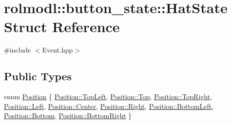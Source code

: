 \hypertarget{structrolmodl_1_1button__state_1_1_hat_state}{}\section{rolmodl\+::button\+\_\+state\+::Hat\+State Struct Reference}
\label{structrolmodl_1_1button__state_1_1_hat_state}


{\ttfamily \#include $<$Event.\+hpp$>$}

\subsection*{Public Types}
\begin{DoxyCompactItemize}
\item 
enum \mbox{\hyperlink{structrolmodl_1_1button__state_1_1_hat_state_ae56167e0c2bf1733215310a36461821e}{Position}} \{ \newline
\mbox{\hyperlink{structrolmodl_1_1button__state_1_1_hat_state_ae56167e0c2bf1733215310a36461821eab32beb056fbfe36afbabc6c88c81ab36}{Position\+::\+Top\+Left}}, 
\mbox{\hyperlink{structrolmodl_1_1button__state_1_1_hat_state_ae56167e0c2bf1733215310a36461821eaa4ffdcf0dc1f31b9acaf295d75b51d00}{Position\+::\+Top}}, 
\mbox{\hyperlink{structrolmodl_1_1button__state_1_1_hat_state_ae56167e0c2bf1733215310a36461821ea1d85a557894c340c318493f33bfa8efb}{Position\+::\+Top\+Right}}, 
\mbox{\hyperlink{structrolmodl_1_1button__state_1_1_hat_state_ae56167e0c2bf1733215310a36461821ea945d5e233cf7d6240f6b783b36a374ff}{Position\+::\+Left}}, 
\newline
\mbox{\hyperlink{structrolmodl_1_1button__state_1_1_hat_state_ae56167e0c2bf1733215310a36461821ea4f1f6016fc9f3f2353c0cc7c67b292bd}{Position\+::\+Center}}, 
\mbox{\hyperlink{structrolmodl_1_1button__state_1_1_hat_state_ae56167e0c2bf1733215310a36461821ea92b09c7c48c520c3c55e497875da437c}{Position\+::\+Right}}, 
\mbox{\hyperlink{structrolmodl_1_1button__state_1_1_hat_state_ae56167e0c2bf1733215310a36461821ea98e5a1c44509157ebcaf46c515c78875}{Position\+::\+Bottom\+Left}}, 
\mbox{\hyperlink{structrolmodl_1_1button__state_1_1_hat_state_ae56167e0c2bf1733215310a36461821ea2ad9d63b69c4a10a5cc9cad923133bc4}{Position\+::\+Bottom}}, 
\newline
\mbox{\hyperlink{structrolmodl_1_1button__state_1_1_hat_state_ae56167e0c2bf1733215310a36461821ea9146bfc669fddc88db2c4d89297d0e9a}{Position\+::\+Bottom\+Right}}
 \}
\end{DoxyCompactItemize}
